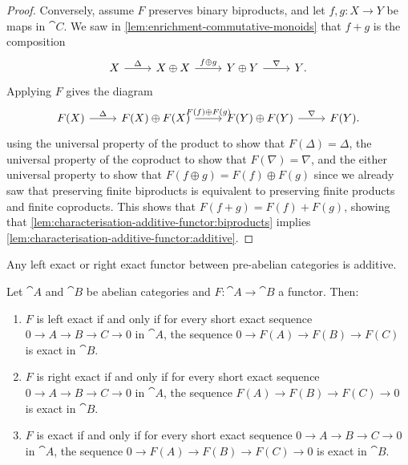\begin{proof}
Conversely, assume \(F\) preserves binary biproducts, and let \(f,g\colon X\to Y\) be maps in \(\cat C\).
We saw in \cref{lem:enrichment-commutative-monoids} that \(f+g\) is the composition
\begin{equation*}
  \begin{tikzcd}
    X \ar[r, "\Delta"] & X\oplus X \ar[r, "f\oplus g"] & Y\oplus Y \ar[r, "\nabla"] & Y\text{.}
  \end{tikzcd}
\end{equation*}
Applying \(F\) gives the diagram
\begin{equation*}
  \begin{tikzcd}
    F(X) \ar[r, "\Delta"] & F(X)\oplus F(X) \ar[r, "F(f)\oplus F(g)"] & F(Y)\oplus F(Y) \ar[r, "\nabla"] & F(Y)\text{.}
  \end{tikzcd}
\end{equation*}
using the universal property of the product to show that \(F(\Delta)=\Delta\), the universal property of the coproduct to show that \(F(\nabla)=\nabla\), and the either universal property to show that \(F(f\oplus g)=F(f)\oplus F(g)\) since we already saw that preserving finite biproducts is equivalent to preserving finite products and finite coproducts.
This shows that \(F(f+g)=F(f)+F(g)\), showing that \cref{lem:characterisation-additive-functor:biproducts} implies \cref{lem:characterisation-additive-functor:additive}.
\end{proof}

\begin{cor}
Any left exact or right exact functor between pre-abelian categories is additive.
\end{cor}

\begin{lem}\label{lem:exactness-short-exact-sequence}
Let \(\cat A\) and \(\cat B\) be abelian categories and \(F\colon\cat A\to\cat B\) a functor.
Then:
\begin{enumerate}
\item \(F\) is left exact if and only if for every short exact sequence \(0\to A\to B\to C\to 0\) in \(\cat A\), the sequence \(0\to F(A)\to F(B)\to F(C)\) is exact in \(\cat B\).
\item \(F\) is right exact if and only if for every short exact sequence \(0\to A\to B\to C\to 0\) in \(\cat A\), the sequence \(F(A)\to F(B)\to F(C)\to 0\) is exact in \(\cat B\).
\item \(F\) is exact if and only if for every short exact sequence \(0\to A\to B\to C\to 0\) in \(\cat A\), the sequence \(0\to F(A)\to F(B)\to F(C)\to 0\) is exact in \(\cat B\).
\end{enumerate}
\end{lem}


